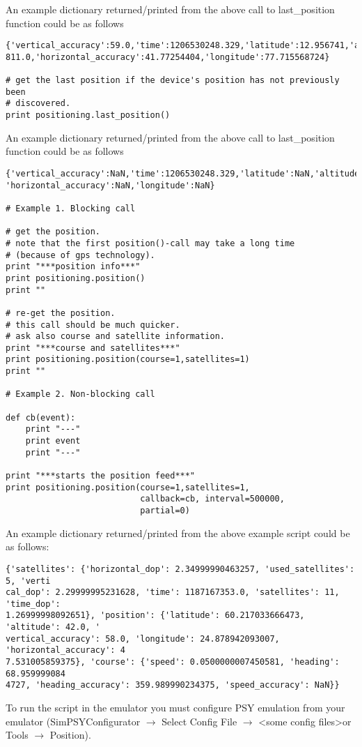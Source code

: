 An example dictionary returned/printed from the above call to last_position
function could be as follows

\begin{verbatim}
{'vertical_accuracy':59.0,'time':1206530248.329,'latitude':12.956741,'altitude':
811.0,'horizontal_accuracy':41.77254404,'longitude':77.715568724}

# get the last position if the device's position has not previously been 
# discovered.
print positioning.last_position()
\end{verbatim}

An example dictionary returned/printed from the above call to last_position
function could be as follows

\begin{verbatim}
{'vertical_accuracy':NaN,'time':1206530248.329,'latitude':NaN,'altitude':NaN,
'horizontal_accuracy':NaN,'longitude':NaN}

# Example 1. Blocking call

# get the position. 
# note that the first position()-call may take a long time
# (because of gps technology).
print "***position info***"                         
print positioning.position()
print ""

# re-get the position.
# this call should be much quicker.
# ask also course and satellite information.
print "***course and satellites***" 
print positioning.position(course=1,satellites=1)
print ""

# Example 2. Non-blocking call

def cb(event):
    print "---"
    print event
    print "---"

print "***starts the position feed***" 
print positioning.position(course=1,satellites=1,
                           callback=cb, interval=500000,
                           partial=0)
\end{verbatim}

An example dictionary returned/printed from the above example script could be 
as follows:

\begin{verbatim}
{'satellites': {'horizontal_dop': 2.34999990463257, 'used_satellites': 5, 'verti
cal_dop': 2.29999995231628, 'time': 1187167353.0, 'satellites': 11, 'time_dop':
1.26999998092651}, 'position': {'latitude': 60.217033666473, 'altitude': 42.0, '
vertical_accuracy': 58.0, 'longitude': 24.878942093007, 'horizontal_accuracy': 4
7.531005859375}, 'course': {'speed': 0.0500000007450581, 'heading': 68.959999084
4727, 'heading_accuracy': 359.989990234375, 'speed_accuracy': NaN}}
\end{verbatim}

To run the script in the emulator you must configure PSY emulation from your 
emulator (SimPSYConfigurator $\rightarrow$ Select Config File $\rightarrow$ 
\textless some config files\textgreater or Tools $\rightarrow$ Position).
